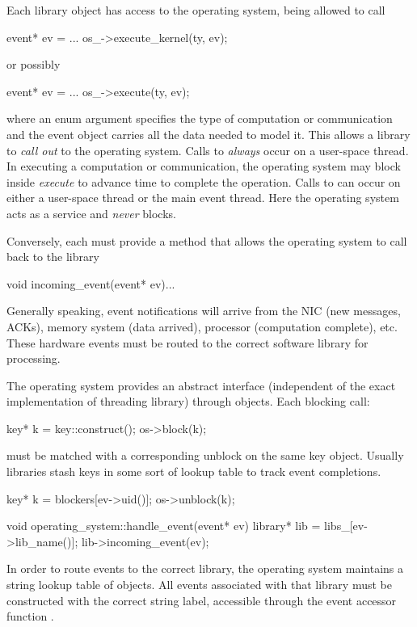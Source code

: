 Each library object has access to the operating system, being allowed to call

\begin{CppCode}
event* ev = ...
os_->execute_kernel(ty, ev);
\end{CppCode}
or possibly 

\begin{CppCode}
event* ev = ...
os_->execute(ty, ev);
\end{CppCode}
where an enum argument  specifies the type of computation or communication and the event object carries all the data needed to model it.
This allows a library to \emph{call out} to the operating system.
Calls to  \emph{always} occur on a user-space thread. 
In executing a computation or communication, the operating system may block inside \emph{execute} to advance time to complete the operation.
Calls to  can occur on either a user-space thread or the main event thread.
Here the operating system acts as a service and \emph{never} blocks.

Conversely, each  must provide a  method that allows the operating system to call back to the library

\begin{CppCode}
void incoming_event(event* ev){...}
\end{CppCode}
Generally speaking, event notifications will arrive from the NIC (new messages, ACKs), memory system (data arrived), processor (computation complete), etc.
These hardware events must be routed to the correct software library for processing.

The operating system provides an abstract interface (independent of the exact implementation of threading library) through  objects.
Each blocking call:

\begin{CppCode}
key* k = key::construct();
os->block(k);
\end{CppCode}

must be matched with a corresponding unblock on the same key object.
Usually libraries stash keys in some sort of lookup table to track event completions.

\begin{CppCode}
key* k = blockers[ev->uid()];
os->unblock(k);
\end{CppCode}

\begin{CppCode}
void
operating_system::handle_event(event* ev) {
  library* lib = libs_[ev->lib_name()];
  lib->incoming_event(ev);
}
\end{CppCode}
In order to route events to the correct library, the operating system maintains a string lookup table of  objects.
All events associated with that library must be constructed with the correct string label, 
accessible through the event accessor function .

